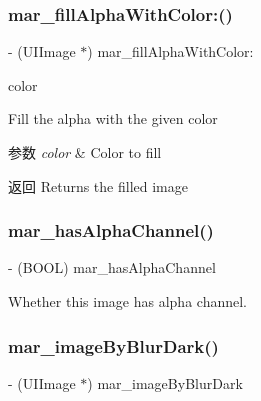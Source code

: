 \subsubsection{\texorpdfstring{mar\+\_\+fill\+Alpha\+With\+Color\+:()}{mar\_fillAlphaWithColor:()}}
{\footnotesize\ttfamily -\/ (U\+I\+Image $\ast$) mar\+\_\+fill\+Alpha\+With\+Color\+: \begin{DoxyParamCaption}\item[{(U\+I\+Color $\ast$)}]{color }\end{DoxyParamCaption}}

Fill the alpha with the given color


\begin{DoxyParams}{参数}
{\em color} & Color to fill\\
\hline
\end{DoxyParams}
\begin{DoxyReturn}{返回}
Returns the filled image 
\end{DoxyReturn}
\mbox{\label{category_u_i_image_07_m_a_r_e_x_08_aaa533f9e0fc0daba1009929f7deaf8ae}} 
\subsubsection{\texorpdfstring{mar\+\_\+has\+Alpha\+Channel()}{mar\_hasAlphaChannel()}}
{\footnotesize\ttfamily -\/ (B\+O\+OL) mar\+\_\+has\+Alpha\+Channel \begin{DoxyParamCaption}{ }\end{DoxyParamCaption}}

Whether this image has alpha channel. \mbox{\label{category_u_i_image_07_m_a_r_e_x_08_ab68df1119dd1bab21193ff7d8c2a5658}} 
\subsubsection{\texorpdfstring{mar\+\_\+image\+By\+Blur\+Dark()}{mar\_imageByBlurDark()}}
{\footnotesize\ttfamily -\/ (U\+I\+Image $\ast$) mar\+\_\+image\+By\+Blur\+Dark \begin{DoxyParamCaption}{ }\end{DoxyParamCaption}}

